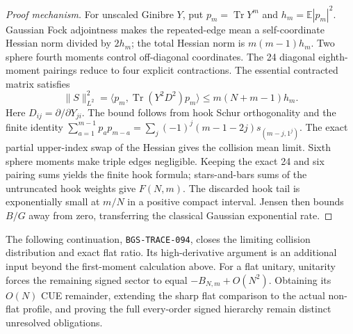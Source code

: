 \begin{proof}[Proof mechanism]
For unscaled Ginibre $Y$, put $p_m=\operatorname{Tr}Y^m$ and
$h_m=\mathbb E|p_m|^2$. Gaussian Fock adjointness makes the repeated-edge
mean a self-coordinate Hessian norm divided by $2h_m$; the total Hessian
norm is $m(m-1)h_m$. Two sphere fourth moments control off-diagonal
coordinates. The 24 diagonal eighth-moment pairings reduce to four
explicit contractions. The essential contracted matrix satisfies
\[
 \|S\|_{L^2}^2=\langle p_m,\operatorname{Tr}(Y^2D^2)p_m\rangle
       \le m(N+m-1)h_m.
\]
Here $D_{ij}=\partial/\partial Y_{ji}$. The bound follows from hook Schur
orthogonality and the finite identity
$\sum_{a=1}^{m-1}p_ap_{m-a}
=\sum_j(-1)^j(m-1-2j)s_{(m-j,1^j)}$.
The exact partial upper-index swap of the Hessian gives the collision
mean limit. Sixth sphere moments make triple edges negligible.
Keeping the exact 24 and six pairing sums yields the finite hook formula;
stars-and-bars sums of the untruncated hook weights give $F(N,m)$.
The discarded hook tail is exponentially small at $m/N$ in a positive
compact interval. Jensen then bounds $B/G$ away from zero, transferring
the classical Gaussian exponential rate.
\end{proof}

The following continuation, \texttt{BGS-TRACE-094}, closes the limiting
collision distribution and exact flat ratio. Its high-derivative argument
is an additional input beyond the first-moment calculation above.
For a flat unitary, unitarity forces the remaining signed sector to equal
$-B_{N,m}+O(N^2)$. Obtaining its $O(N)$ CUE remainder, extending the sharp
flat comparison to the actual non-flat profile, and proving the full
every-order signed hierarchy remain distinct unresolved obligations.

